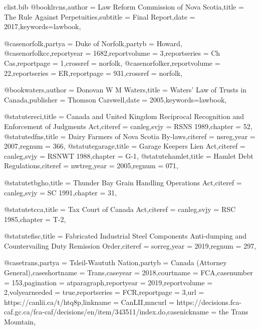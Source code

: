 \begin{filecontents*}[overwrite]{clist\jobname.bib}
@book{lrcns,author =  {{Law Reform Commission of Nova Scotia}},title =  {The Rule Against Perpetuities},subtitle =  {Final Report},date =  {2017},keywords={lawbook},}

@case{norfolk,partya =  {Duke of Norfolk},partyb =  {Howard},}
@case{norfolkcc,reportyear =  {1682},reportvolume =  {3},reportseries =  {Ch Cas},reportpage =  {1},crossref =  {norfolk},}
@case{norfolker,reportvolume =  {22},reportseries =  {ER},reportpage =  {931},crossref =  {norfolk},}


@book{waters,author =  {Donovan W M Waters},title =  {Waters' Law of Trusts in Canada},publisher =  {Thomson Carswell},date =  {2005},keywords={lawbook},}

@statute{reci,title =  {Canada and United Kingdom Reciprocal Recognition and Enforcement of Judgments Act},citeref =  {canleg},svjy =  {RSNS 1989},chapter =  {52},}
@statute{dfns,title =  {Dairy Farmers of Nova Scotia By-laws},citeref =  {nsreg},year =  {2007},regnum =  {366},}
@statute{garage,title =  {Garage Keepers Lien Act},citeref =  {canleg},svjy =  {RSNWT 1988},chapter =  {G-1},}
@statute{hamlet,title =  {Hamlet Debt Regulations},citeref =  {nwtreg},year =  {2005},regnum =  {071},}


@statute{tbgho,title =  {Thunder Bay Grain Handling Operations Act},citeref =  {canleg},svjy =  {SC 1991},chapter =  {31},}

@statute{tcca,title =  {Tax Court of Canada Act},citeref =  {canleg},svjy =  {RSC 1985},chapter =  {T-2},}

@statute{fisc,title =  {Fabricated Industrial Steel Components Anti-dumping and Countervailing Duty Remission Order},citeref =  {sorreg},year =  {2019},regnum =  {297},}

@case{trans,partya =  {Tsleil-Waututh Nation},partyb =  {Canada (Attorney General)},caseshortname =  {Trans},caseyear =  {2018},courtname =  {FCA},casenumber =  {153},pagination =  {atparagraph},reportyear =  {2019},reportvolume =  {2},volyearneeded =  {true},reportseries =  {FCR},reportpage =  {3},url =  {https://canlii.ca/t/htq8p},linkname =  {CanLII},mncurl =  {https://decisions.fca-caf.gc.ca/fca-caf/decisions/en/item/343511/index.do},casenickname =  {the Trans Mountain},}


\end{filecontents*}
